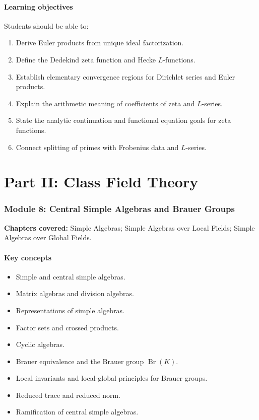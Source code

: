 \documentclass[11pt]{article}
\begin{document}
\paragraph{Learning objectives}
Students should be able to:
\begin{enumerate}
    \item Derive Euler products from unique ideal factorization.
    \item Define the Dedekind zeta function and Hecke $L$-functions.
    \item Establish elementary convergence regions for Dirichlet series and Euler products.
    \item Explain the arithmetic meaning of coefficients of zeta and $L$-series.
    \item State the analytic continuation and functional equation goals for zeta functions.
    \item Connect splitting of primes with Frobenius data and $L$-series.
\end{enumerate}

\section{Part II: Class Field Theory}

\subsubsection*{Module 8: Central Simple Algebras and Brauer Groups}

\textbf{Chapters covered:} Simple Algebras; Simple Algebras over Local Fields; Simple Algebras over Global Fields.

\paragraph{Key concepts}
\begin{itemize}
    \item Simple and central simple algebras.
    \item Matrix algebras and division algebras.
    \item Representations of simple algebras.
    \item Factor sets and crossed products.
    \item Cyclic algebras.
    \item Brauer equivalence and the Brauer group $\operatorname{Br}(K)$.
    \item Local invariants and local-global principles for Brauer groups.
    \item Reduced trace and reduced norm.
    \item Ramification of central simple algebras.
\end{itemize}
\end{document}
